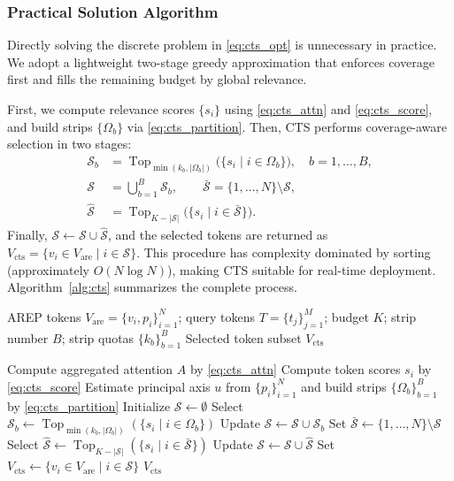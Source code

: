\documentclass[journal,twoside,web]{ieeecolor}
\newcommand{\eqnref}[1]{\eqref{#1}} %
\begin{document}
\subsubsection{Practical Solution Algorithm}
\label{sec:cts_solution}

Directly solving the discrete problem in \eqnref{eq:cts_opt} is unnecessary in practice.
We adopt a lightweight two-stage greedy approximation that enforces coverage first and fills the remaining budget by global relevance.

First, we compute relevance scores $\{s_i\}$ using \eqnref{eq:cts_attn} and \eqnref{eq:cts_score}, and build strips $\{\Omega_b\}$ via \eqnref{eq:cts_partition}.
Then, CTS performs coverage-aware selection in two stages:
\begin{equation}
  \begin{aligned}
    \mathcal{S}_b
    &= \operatorname{Top}_{\min(k_b,|\Omega_b|)}\big(\{s_i\mid i\in\Omega_b\}\big),
    \quad b=1,\ldots,B,\\
    \mathcal{S}
    &= \bigcup_{b=1}^{B}\mathcal{S}_b,\qquad
    \bar{\mathcal{S}}=\{1,\ldots,N\}\setminus\mathcal{S},\\
    \hat{\mathcal{S}}
    &= \operatorname{Top}_{K-|\mathcal{S}|}\big(\{s_i\mid i\in\bar{\mathcal{S}}\}\big).
  \end{aligned}
  \label{eq:cts_stage}
\end{equation}
Finally, $\mathcal{S}\leftarrow\mathcal{S}\cup\hat{\mathcal{S}}$, and the selected tokens are returned as $V_{\mathrm{cts}}=\{v_i\in V_{\mathrm{are}}\mid i\in\mathcal{S}\}$.
This procedure has complexity dominated by sorting (approximately $O(N\log N)$), making CTS suitable for real-time deployment.
Algorithm~\ref{alg:cts} summarizes the complete process.

\begin{algorithm}[t]
  \caption{Coverage-Aware Token Selection (CTS)}
  \label{alg:cts}
  \begin{algorithmic}[1]
    \Require AREP tokens $V_{\mathrm{are}}=\{v_i,p_i\}_{i=1}^{N}$; query tokens $T=\{t_j\}_{j=1}^{M}$; budget $K$; strip number $B$; strip quotas $\{k_b\}_{b=1}^{B}$
    \Ensure Selected token subset $V_{\mathrm{cts}}$

    \State Compute aggregated attention $A$ by \eqnref{eq:cts_attn}
    \State Compute token scores $s_i$ by \eqnref{eq:cts_score}
    \State Estimate principal axis $u$ from $\{p_i\}_{i=1}^{N}$ and build strips $\{\Omega_b\}_{b=1}^{B}$ by \eqnref{eq:cts_partition}
    \State Initialize $\mathcal{S}\gets\emptyset$
      \State Select $\mathcal{S}_b\gets \operatorname{Top}_{\min(k_b,|\Omega_b|)}(\{s_i\mid i\in\Omega_b\})$
      \State Update $\mathcal{S}\gets\mathcal{S}\cup\mathcal{S}_b$
    \EndFor
    \State Set $\bar{\mathcal{S}}\gets\{1,\ldots,N\}\setminus\mathcal{S}$
    \State Select $\hat{\mathcal{S}}\gets \operatorname{Top}_{K-|\mathcal{S}|}(\{s_i\mid i\in\bar{\mathcal{S}}\})$
    \State Update $\mathcal{S}\gets\mathcal{S}\cup\hat{\mathcal{S}}$
    \State Set $V_{\mathrm{cts}}\gets\{v_i\in V_{\mathrm{are}}\mid i\in\mathcal{S}\}$
    \State \Return $V_{\mathrm{cts}}$
  \end{algorithmic}
\end{algorithm}
\end{document}
